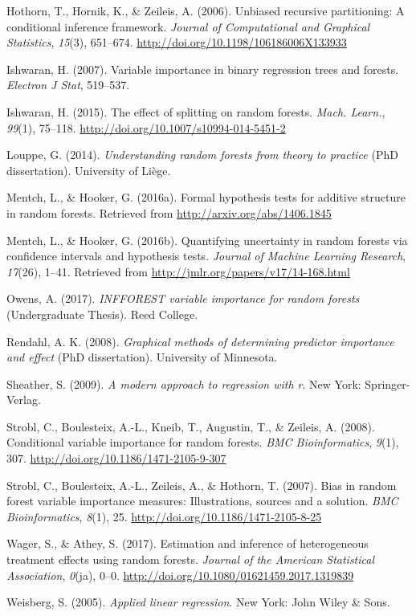 \documentclass[12pt,twoside]{reedthesis}
\theoremstyle{definition}
\theoremstyle{definition}
\theoremstyle{definition}
\theoremstyle{remark}
\begin{document}
\hypertarget{ref-hothorn2006}{}
Hothorn, T., Hornik, K., \& Zeileis, A. (2006). Unbiased recursive
partitioning: A conditional inference framework. \emph{Journal of
Computational and Graphical Statistics}, \emph{15}(3), 651--674.
\url{http://doi.org/10.1198/106186006X133933}

\hypertarget{ref-ishwaran2007}{}
Ishwaran, H. (2007). Variable importance in binary regression trees and
forests. \emph{Electron J Stat}, 519--537.

\hypertarget{ref-ishwaran2015}{}
Ishwaran, H. (2015). The effect of splitting on random forests.
\emph{Mach. Learn.}, \emph{99}(1), 75--118.
\url{http://doi.org/10.1007/s10994-014-5451-2}

\hypertarget{ref-louppe2014}{}
Louppe, G. (2014). \emph{Understanding random forests from theory to
practice} (PhD dissertation). University of Liège.

\hypertarget{ref-mentch2016b}{}
Mentch, L., \& Hooker, G. (2016a). Formal hypothesis tests for additive
structure in random forests. Retrieved from
\url{http://arxiv.org/abs/1406.1845}

\hypertarget{ref-mentch2016a}{}
Mentch, L., \& Hooker, G. (2016b). Quantifying uncertainty in random
forests via confidence intervals and hypothesis tests. \emph{Journal of
Machine Learning Research}, \emph{17}(26), 1--41. Retrieved from
\url{http://jmlr.org/papers/v17/14-168.html}

\hypertarget{ref-owens2017}{}
Owens, A. (2017). \emph{INFFOREST variable importance for random
forests} (Undergraduate Thesis). Reed College.

\hypertarget{ref-rendahl2008}{}
Rendahl, A. K. (2008). \emph{Graphical methods of determining predictor
importance and effect} (PhD dissertation). University of Minnesota.

\hypertarget{ref-sheather2009}{}
Sheather, S. (2009). \emph{A modern approach to regression with r}. New
York: Springer-Verlag.

\hypertarget{ref-strobl2008}{}
Strobl, C., Boulesteix, A.-L., Kneib, T., Augustin, T., \& Zeileis, A.
(2008). Conditional variable importance for random forests. \emph{BMC
Bioinformatics}, \emph{9}(1), 307.
\url{http://doi.org/10.1186/1471-2105-9-307}

\hypertarget{ref-strobl2007}{}
Strobl, C., Boulesteix, A.-L., Zeileis, A., \& Hothorn, T. (2007). Bias
in random forest variable importance measures: Illustrations, sources
and a solution. \emph{BMC Bioinformatics}, \emph{8}(1), 25.
\url{http://doi.org/10.1186/1471-2105-8-25}

\hypertarget{ref-wager2017}{}
Wager, S., \& Athey, S. (2017). Estimation and inference of
heterogeneous treatment effects using random forests. \emph{Journal of
the American Statistical Association}, \emph{0}(ja), 0--0.
\url{http://doi.org/10.1080/01621459.2017.1319839}

\hypertarget{ref-weisberg2005}{}
Weisberg, S. (2005). \emph{Applied linear regression}. New York: John
Wiley \& Sons.


\end{document}
